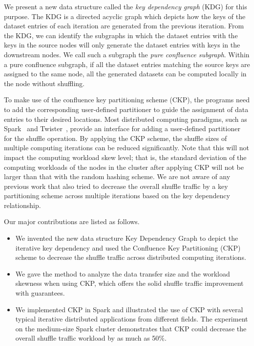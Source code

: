 \documentclass[10pt,journal,compsoc]{IEEEtran}
\begin{document}
We present a new data structure called the \emph{key dependency graph} (KDG) for this purpose.
The KDG is a directed acyclic graph which depicts how the keys of the
dataset entries of each iteration are generated from the previous iteration.
From the KDG, we can identify the subgraphs in which the dataset
entries with the keys in the source nodes will only generate the dataset
entries with keys in the downstream nodes. We call such a subgraph
the \emph{pure confluence subgraph}.
Within a pure confluence subgraph, if all the dataset entries matching
the source keys are assigned to the same node, all the generated
datasets can be computed locally in the node without shuffling.

To make use of the confluence key partitioning scheme (CKP), the
programs need to add the corresponding user-defined partitioner
to guide the assignment of data entries to their desired locations.
Most distributed computing paradigms, such as Spark~\cite{zaharia2012resilient} and Twister~\cite{ekanayake2010twister},
provide an interface for adding a user-defined partitioner for the shuffle
operation.
By applying the CKP scheme, the shuffle sizes of multiple computing
iterations can be reduced significantly. %
Note that this will not impact the computing workload skew level; that is,
the standard deviation of the computing workloads of the
nodes in the cluster after applying CKP will not be larger than that
with the random hashing scheme.
We are not aware of any previous work
that also tried to decrease the overall
shuffle traffic by a key partitioning scheme across multiple
iterations based on the
key dependency relationship.

Our major contributions are listed as follows.
\begin{itemize}
\setlength{\itemsep}{0pt}
\setlength{\parskip}{0pt}
\setlength{\parsep}{0pt}
\item We invented the new data structure Key Dependency Graph to depict the iterative key dependency
and used the Confluence Key Partitioning (CKP) scheme to decrease the shuffle traffic
across distributed computing iterations.

\item We gave the method to analyze the data transfer size and the workload skewness when using CKP, which offers the solid shuffle traffic improvement with guarantees. 

\item We implemented CKP in Spark and illustrated the use of CKP with several typical iterative distributed applications from different fields. 
The experiment on the medium-size Spark cluster demonstrates that CKP could decrease the overall shuffle traffic workload by as much as 50\%.  
\end{itemize}
\end{document}
